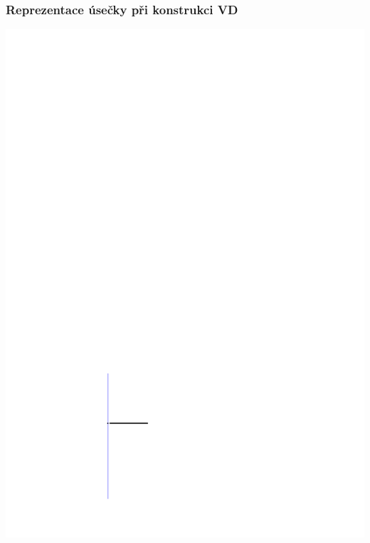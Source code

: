 \documentclass[notes=false,pdftex]{beamer}
\begin{document}
\begin{frame}[label=VDdetail]
	\frametitle{Reprezentace úsečky při konstrukci VD}
	\includegraphics[height=1\textheight,clip=true,trim=150pt 167pt 409pt 642pt]{images/line_segment-01-endpoint_and_rest_of_line.pdf} 
\end{frame}
\end{document}
